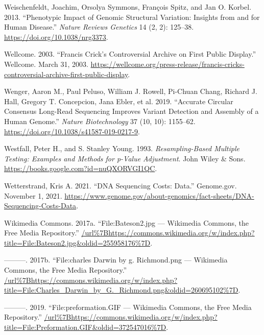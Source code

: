 \documentclass[
]{book}
\newlength{\cslhangindent}
\newlength{\cslentryspacingunit} %
\newenvironment{CSLReferences}[2] %
 {%
  \setlength{\parindent}{0pt}
  \ifodd #1
  \let\oldpar\par
  \def\par{\hangindent=\cslhangindent\oldpar}
  \fi
  \setlength{\parskip}{#2\cslentryspacingunit}
 }%
 {}
\begin{document}
\begin{CSLReferences}{1}{0}
\leavevmode{}%
Weischenfeldt, Joachim, Orsolya Symmons, François Spitz, and Jan O. Korbel. 2013. {``Phenotypic Impact of Genomic Structural Variation: Insights from and for Human Disease.''} \emph{Nature Reviews Genetics} 14 (2, 2): 125--38. \url{https://doi.org/10.1038/nrg3373}.

\leavevmode{}%
Wellcome. 2003. {``Francis {Crick}'s Controversial Archive on First Public Display.''} {Wellcome}. March 31, 2003. \url{https://wellcome.org/press-release/francis-cricks-controversial-archive-first-public-display}.

\leavevmode{}%
Wenger, Aaron M., Paul Peluso, William J. Rowell, Pi-Chuan Chang, Richard J. Hall, Gregory T. Concepcion, Jana Ebler, et al. 2019. {``Accurate Circular Consensus Long-Read Sequencing Improves Variant Detection and Assembly of a Human Genome.''} \emph{Nature Biotechnology} 37 (10, 10): 1155--62. \url{https://doi.org/10.1038/s41587-019-0217-9}.

\leavevmode{}%
Westfall, Peter H., and S. Stanley Young. 1993. \emph{Resampling-{Based Multiple Testing}: {Examples} and {Methods} for p-{Value Adjustment}}. {John Wiley \& Sons}. \url{https://books.google.com?id=nuQXORVGI1QC}.

\leavevmode{}%
Wetterstrand, Kris A. 2021. {``{DNA Sequencing Costs}: {Data}.''} {Genome.gov}. November 1, 2021. \url{https://www.genome.gov/about-genomics/fact-sheets/DNA-Sequencing-Costs-Data}.

\leavevmode{}%
Wikimedia Commons. 2017a. {``File:Bateson2.jpg --- Wikimedia Commons{,} the Free Media Repository.''} \url{/url\%7Bhttps://commons.wikimedia.org/w/index.php?title=File:Bateson2.jpg\&oldid=255958176\%7D}.

\leavevmode{}%
---------. 2017b. {``File:charles Darwin by g. Richmond.png --- Wikimedia Commons{,} the Free Media Repository.''} \url{/url\%7Bhttps://commons.wikimedia.org/w/index.php?title=File:Charles_Darwin_by_G._Richmond.png\&oldid=260695102\%7D}.

\leavevmode{}%
---------. 2019. {``File:preformation.GIF --- Wikimedia Commons{,} the Free Media Repository.''} \url{/url\%7Bhttps://commons.wikimedia.org/w/index.php?title=File:Preformation.GIF\&oldid=372547016\%7D}.


\end{CSLReferences}
\end{document}
